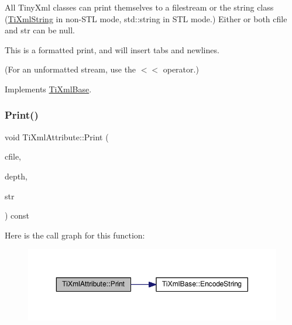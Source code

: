 All Tiny\+Xml classes can print themselves to a filestream or the string class (\hyperlink{class_ti_xml_string}{Ti\+Xml\+String} in non-\/\+S\+TL mode, std\+::string in S\+TL mode.) Either or both cfile and str can be null.

This is a formatted print, and will insert tabs and newlines.

(For an unformatted stream, use the $<$$<$ operator.) 

Implements \hyperlink{class_ti_xml_base_a0de56b3f2ef14c65091a3b916437b512}{Ti\+Xml\+Base}.

\mbox{\label{class_ti_xml_attribute_a5c8f72a7d1a49972434d45f4c2889e0e}} 
\subsubsection{\texorpdfstring{Print()}{Print()}\hspace{0.1cm}{\footnotesize\ttfamily [2/2]}}
{\footnotesize\ttfamily void Ti\+Xml\+Attribute\+::\+Print (\begin{DoxyParamCaption}\item[{F\+I\+LE $\ast$}]{cfile,  }\item[{int}]{depth,  }\item[{\hyperlink{tinyxml_8h_a92bada05fd84d9a0c9a5bbe53de26887}{T\+I\+X\+M\+L\+\_\+\+S\+T\+R\+I\+NG} $\ast$}]{str }\end{DoxyParamCaption}) const}

Here is the call graph for this function\+:
\nopagebreak
\begin{figure}[H]
\begin{center}
\leavevmode
\includegraphics[width=350pt]{class_ti_xml_attribute_a5c8f72a7d1a49972434d45f4c2889e0e_cgraph}
\end{center}
\end{figure}
\mbox{\label{class_ti_xml_attribute_a6fa41b710c1b79de37a97004aa600c06}} 

